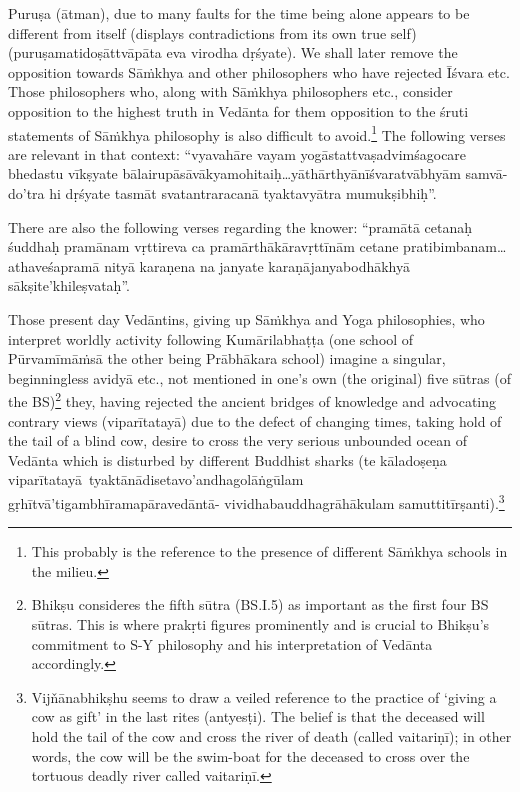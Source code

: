 Puruṣa (ātman), due to many faults for the time being alone appears to be different from itself (displays contradictions from its own true self) (puruṣamatidoṣāttvāpāta eva virodha dṛśyate). We shall later remove  the opposition towards Sāṁkhya and other philosophers who have rejected Īśvara etc. Those philosophers who, along with Sāṁkhya philosophers etc., consider opposition to the highest truth in Vedānta for them opposition to the śruti statements of Sāṁkhya philosophy is also difficult to avoid.\footnote{This probably is the reference to the presence of different Sāṁkhya schools in the milieu.} The following verses are relevant in that context: “vyavahāre vayam yogāstattvaṣadvimśagocare bhedastu vīkṣyate bālairupāsāvākyamohitaiḥ…yāthārthyānīśvaratvābhyām samvā-\-\break\hbox{do’\-tra} hi dṛśyate tasmāt svatantraracanā tyaktavyātra mumukṣibhiḥ”.

There are also the following verses regarding the knower: “pramātā cetanaḥ śuddhaḥ pramānam vṛttireva ca pramārthākāravṛttīnām cetane pratibimbanam…athaveśapramā nityā karaṇena na janyate karaṇājanyabodhākhyā sākṣite’khileṣvataḥ”.

Those present day Vedāntins, giving up Sāṁkhya and Yoga philosophies, who interpret worldly activity following Kumārilabhaṭṭa (one school of Pūrvamīmāṁsā the other being Prābhākara school) imagine a singular, beginningless avidyā etc., not mentioned in one’s own (the original) five sūtras (of the BS)\footnote{Bhikṣu consideres the fifth sūtra (BS.I.5) as important as the first four BS sūtras. This is where prakṛti figures prominently and is crucial to Bhikṣu’s commitment to S-Y philosophy and his interpretation of Vedānta accordingly.} they, having rejected the ancient bridges of knowledge and advocating contrary views (viparītatayā) due to the defect of changing times, taking hold of the tail of a blind cow, desire to cross the very serious unbounded ocean of Vedānta which is disturbed by different Buddhist sharks (te kāladoṣeṇa  viparītatayā tya\-ktānādisetavo’andhagolāṅgūlam gṛhītvā’tigambhīramapāravedāntā-\- vividhabauddhagrāhākulam samuttitīrṣanti).\footnote{Vijňānabhikṣhu seems to draw a veiled reference to the practice of ‘giving a cow as gift’ in the last rites (antyesṭi). The belief is that the deceased will hold the tail of the cow and cross the river of death (called vaitariṇī); in other words, the cow will be the swim-boat for the deceased to cross over the tortuous deadly river called vaitariṇī.}


